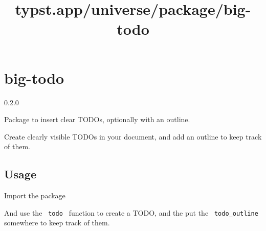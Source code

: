\title{typst.app/universe/package/big-todo}

\label{banner}
\section{big-todo}\label{big-todo}

{ 0.2.0 }

Package to insert clear TODOs, optionally with an outline.

\label{readme}
Create clearly visible TODOs in your document, and add an outline to
keep track of them.

\subsection{Usage}\label{usage}

Import the package

\begin{Shaded}
\begin{Highlighting}[]
\end{Highlighting}
\end{Shaded}

And use the \texttt{\ todo\ } function to create a TODO, and the put the
\texttt{\ todo\_outline\ } somewhere to keep track of them.

